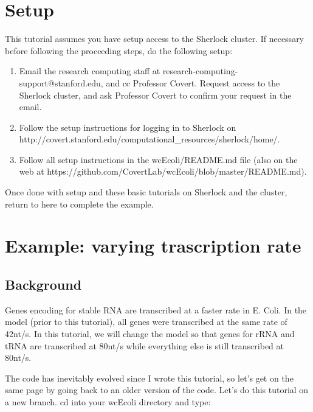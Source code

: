 \documentclass[12pt]{article}
\begin{document}
\section{Setup}
\label{sec:setup}

This tutorial assumes you have setup access to the Sherlock cluster. If necessary before following the proceeding steps, do the following setup:

\begin{enumerate}
\item Email the research computing staff at research-computing-support@stanford.edu, and cc Professor Covert. Request access to the Sherlock cluster, and ask Professor Covert to confirm your request in the email.

\item Follow the setup instructions for logging in to Sherlock on
\linebreak
http://covert.stanford.edu/computational\_resources/sherlock/home/.

\item Follow all setup instructions in the wcEcoli/README.md file (also on the web at https://github.com/CovertLab/wcEcoli/blob/master/README.md).
\end{enumerate}

Once done with setup and these basic tutorials on Sherlock and the cluster, return to here to complete the example.



\section{Example: varying trascription rate}

\subsection{Background}

Genes encoding for stable RNA are transcribed at a faster rate in E. Coli. In the model (prior to this tutorial), all genes were transcribed at the same rate of 42nt/s. In this tutorial, we will change the model so that genes for rRNA and tRNA are transcribed at 80nt/s while everything else is still transcribed at 80nt/s. 
\par

The code has inevitably evolved since I wrote this tutorial, so let’s get on the same page by going back to an older version of the code. Let’s do this tutorial on a new branch. cd into your wcEcoli directory and type:
\end{document}
